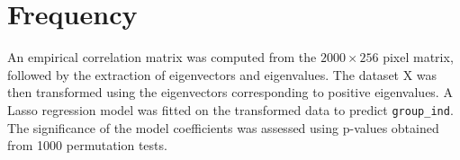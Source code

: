 \documentclass[12pt]{article}
\begin{document}
\section*{Frequency}

An empirical correlation matrix was computed from the \(2000 \times 256\) pixel matrix, followed by the extraction of eigenvectors and eigenvalues. The dataset X was then transformed using the eigenvectors corresponding to positive eigenvalues. A Lasso regression model was fitted on the transformed data to predict \texttt{group\_ind}. The significance of the model coefficients was assessed using p-values obtained from 1000 permutation tests.
\end{document}
